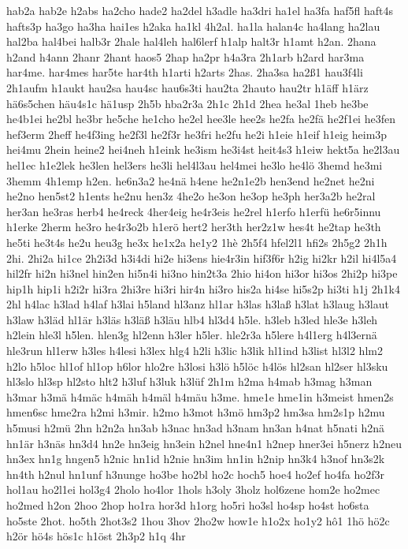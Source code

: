 {hab2a
hab2e
h2abs
ha2cho
hade2
ha2del
h3adle
ha3dri
ha1el
ha3fa
haf5fl
haft4s
hafts3p
ha3go
ha3ha
hai1es
h2aka
ha1kl
4h2al.
ha1la
halan4c
ha4lang
ha2lau
hal2ba
hal4bei
halb3r
2hale
hal4leh
hal6lerf
h1alp
halt3r
h1amt
h2an.
2hana
h2and
h4ann
2hanr
2hant
haos5
2hap
ha2pr
h4a3ra
2h1arb
h2ard
har3ma
har4me.
har4mes
har5te
har4th
h1arti
h2arts
2has.
2ha3sa
ha2ß1
hau3f4li
2h1aufm
h1aukt
hau2sa
hau4sc
hau6s3ti
hau2ta
2hauto
hau2tr
h1äff
h1ärz
hä6s5chen
häu4s1c
hä1usp
2h5b
hba2r3a
2h1c
2h1d
2hea
he3al
1heb
he3be
he4b1ei
he2bl
he3br
he5che
he1cho
he2el
hee3le
hee2s
he2fa
he2fä
he2f1ei
he3fen
hef3erm
2heff
he4f3ing
he2f3l
he2f3r
he3fri
he2fu
he2i
h1eie
h1eif
h1eig
heim3p
hei4mu
2hein
heine2
hei4neh
h1eink
he3ism
he3i4st
heit4s3
h1eiw
hekt5a
he2l3au
hel1ec
h1e2lek
he3len
hel3ers
he3li
hel4l3au
hel4mei
he3lo
he4lö
3hemd
he3mi
3hemm
4h1emp
h2en.
he6n3a2
he4nä
h4ene
he2n1e2b
hen3end
he2net
he2ni
he2no
hen5st2
h1ents
he2nu
hen3z
4he2o
he3on
he3op
he3ph
her3a2b
he2ral
her3an
he3ras
herb4
he4reck
4her4eig
he4r3eis
he2rel
h1erfo
h1erfü
he6r5innu
h1erke
2herm
he3ro
he4r3o2b
h1erö
hert2
her3th
her2z1w
hes4t
he2tap
he3th
he5ti
he3t4s
he2u
heu3g
he3x
he1x2a
he1y2
1hè
2h5f4
hfel2l1
hfi2s
2h5g2
2h1h
2hi.
2hi2a
hi1ce
2h2i3d
h3i4di
hi2e
hi3ens
hie4r3in
hif3f6r
h2ig
hi2kr
h2il
hi4l5a4
hil2fr
hi2n
hi3nel
hin2en
hi5n4i
hi3no
hin2t3a
2hio
hi4on
hi3or
hi3os
2hi2p
hi3pe
hip1h
hip1i
h2i2r
hi3ra
2hi3re
hi3ri
hir4n
hi3ro
his2a
hi4se
hi5s2p
hi3ti
h1j
2h1k4
2hl
h4lac
h3lad
h4laf
h3lai
h5land
hl3anz
hl1ar
h3las
h3laß
h3lat
h3laug
h3laut
h3law
h3läd
hl1är
h3läs
h3läß
h3läu
hlb4
hl3d4
h5le.
h3leb
h3led
hle3e
h3leh
h2lein
hle3l
h5len.
hlen3g
hl2enn
h3ler
h5ler.
hle2r3a
h5lere
h4l1erg
h4l3ernä
hle3run
hl1erw
h3les
h4lesi
h3lex
hlg4
h2li
h3lic
h3lik
hl1ind
h3list
hl3l2
hlm2
h2lo
h5loc
hl1of
hl1op
h6lor
hlo2re
h3losi
h3lö
h5löc
h4lös
hl2san
hl2ser
hl3sku
hl3slo
hl3sp
hl2sto
hlt2
h3luf
h3luk
h3lüf
2h1m
h2ma
h4mab
h3mag
h3man
h3mar
h3mä
h4mäc
h4mäh
h4mäl
h4mäu
h3me.
hme1e
hme1in
h3meist
hmen2s
hmen6sc
hme2ra
h2mi
h3mir.
h2mo
h3mot
h3mö
hm3p2
hm3sa
hm2s1p
h2mu
h5musi
h2mü
2hn
h2n2a
hn3ab
h3nac
hn3ad
h3nam
hn3an
h4nat
h5nati
h2nä
hn1är
h3näs
hn3d4
hn2e
hn3eig
hn3ein
h2nel
hne4n1
h2nep
hner3ei
h5nerz
h2neu
hn3ex
hn1g
hngen5
h2nic
hn1id
h2nie
hn3im
hn1in
h2nip
hn3k4
h3nof
hn3s2k
hn4th
h2nul
hn1unf
h3nunge
ho3be
ho2bl
ho2c
hoch5
hoe4
ho2ef
ho4fa
ho2f3r
hol1au
ho2l1ei
hol3g4
2holo
ho4lor
1hols
h3oly
3holz
hol6zene
hom2e
ho2mec
ho2med
h2on
2hoo
2hop
ho1ra
hor3d
h1org
ho5ri
ho3sl
ho4sp
ho4st
ho6sta
ho5ste
2hot.
ho5th
2hot3s2
1hou
3hov
2ho2w
how1e
h1o2x
ho1y2
hô1
1hö
hö2c
h2ör
hö4s
hös1c
h1öst
2h3p2
h1q
4hr
}
